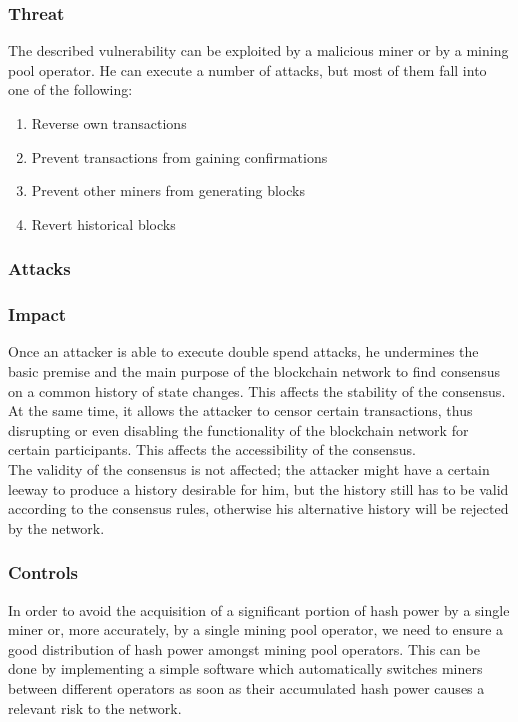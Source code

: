 \documentclass[11pt,a4paper,draft]{article}
\begin{document}
\subsubsection{Threat}

The described vulnerability can be exploited by a malicious miner or by a mining pool operator. He can execute a number of attacks, but most of them fall into one of the following:
\begin{enumerate}
  \item Reverse own transactions
  \item Prevent transactions from gaining confirmations
  \item Prevent other miners from generating blocks
  \item Revert historical blocks
\end{enumerate}

\subsubsection{Attacks}

\subsubsection{Impact}

Once an attacker is able to execute double spend attacks, he undermines the basic premise and the main purpose of the blockchain network to find consensus on a common history of state changes. This affects the stability of the consensus.\\

At the same time, it allows the attacker to censor certain transactions, thus disrupting or even disabling the functionality of the blockchain network for certain participants. This affects the accessibility of the consensus.\\

The validity of the consensus is not affected; the attacker might have a certain leeway to produce a history desirable for him, but the history still has to be valid according to the consensus rules, otherwise his alternative history will be rejected by the network.\\

\subsubsection{Controls}

In order to avoid the acquisition of a significant portion of hash power by a single miner or, more accurately, by a single mining pool operator, we need to ensure a good distribution of hash power amongst mining pool operators. This can be done by implementing a simple software which automatically switches miners between different operators as soon as their accumulated hash power causes a relevant risk to the network.\\
\end{document}
